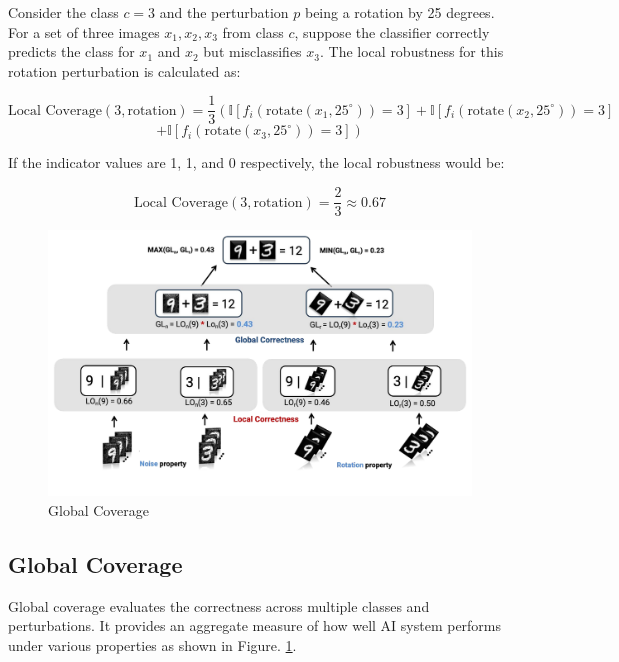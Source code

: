 \begin{example}
  \label{ex:local-robustness}
  Consider the class $c = 3 $ and the perturbation $p $ being a rotation by 25 degrees. For a set of three images $x_1, x_2, x_3 $ from class $c $, suppose the classifier correctly predicts the class for $x_1$ and $x_2$ but misclassifies $x_3$. The local robustness for this rotation perturbation is calculated as:

\[
  \text{Local Coverage}(3, \text{rotation}) = \frac{1}{3} \left( \mathbb{I}[f_i(\text{rotate}(x_1, 25^\circ)) = 3] + \mathbb{I}[f_i(\text{rotate}(x_2, 25^\circ)) = 3] \right.
\]
\[
  \left. + \mathbb{I}[f_i(\text{rotate}(x_3, 25^\circ)) = 3] \right)
\]


  If the indicator values are 1, 1, and 0 respectively, the local robustness would be:

  \begin{equation}
  \text{Local Coverage}(3, \text{rotation}) = \frac{2}{3} \approx 0.67
\end{equation}

\end{example}
\begin{figure}[h]
  \centering
  \includegraphics[width=\textwidth]{figures/noise_rotation_localcal_global.pdf}
  \caption{Global Coverage}
  \label{global}
\end{figure}

\subsection{Global Coverage}

Global coverage evaluates the correctness across multiple classes and perturbations. It provides an aggregate measure of how well AI system performs under various properties as shown in Figure. \ref {global}.

